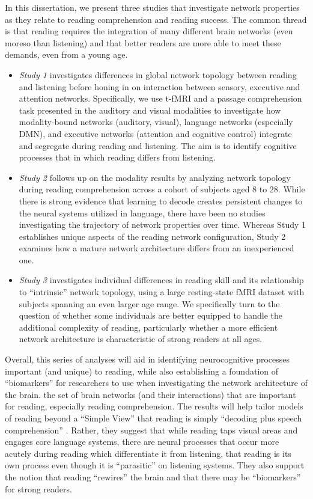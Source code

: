 In this dissertation, we present three studies that investigate network properties as they relate to reading comprehension and reading success. The common thread is that reading requires the integration of many different brain networks (even moreso than listening) and that better readers are more able to meet these demands, even from a young age.

\begin{itemize}

    \item \textit{Study 1} investigates differences in global network topology between reading and listening before honing in on interaction between sensory, executive and attention networks. Specifically, we use t-fMRI and a passage comprehension task presented in the auditory and visual modalities to investigate how modality-bound networks (auditory, visual), language networks (especially DMN), and executive networks (attention and cognitive control) integrate and segregate during reading and listening. The aim is to identify cognitive processes that in which reading differs from listening.

    \item \textit{Study 2} follows up on the modality results by analyzing network topology during reading comprehension across a cohort of subjects aged 8 to 28. While there is strong evidence that learning to decode creates persistent changes to the neural systems utilized in language, there have been no studies investigating the trajectory of network properties over time. Whereas Study 1 establishes unique aspects of the reading network configuration, Study 2 examines how a mature network architecture differs from an inexperienced one.

    \item \textit{Study 3} investigates individual differences in reading skill and its relationship to ``intrinsic'' network topology, using a large resting-state fMRI dataset with subjects spanning an even larger age range. We specifically turn to the question of whether some individuals are better equipped to handle the additional complexity of reading, particularly whether a more efficient network architecture is characteristic of strong readers at all ages. 

\end{itemize}

Overall, this series of analyses will aid in identifying neurocognitive processes important (and unique) to reading, while also establishing a foundation of ``biomarkers'' for researchers to use when investigating the network architecture of the brain.  the set of brain networks (and their interactions) that are important for reading, especially reading comprehension. The results will help tailor models of reading beyond a ``Simple View'' that reading is simply ``decoding plus speech comprehension'' \citep{Gough1988}. Rather, they suggest that while reading taps visual areas and engages core language systems, there are neural processes that occur more acutely during reading which differentiate it from listening, that reading is its own process even though it is ``parasitic'' on listening systems. They also support the notion that reading ``rewires'' the brain and that there may be ``biomarkers'' for strong readers. 